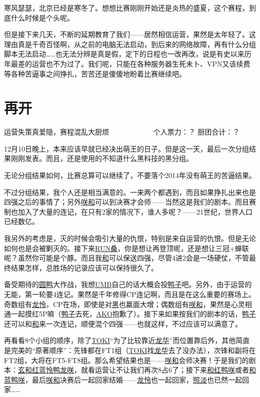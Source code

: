 寒风瑟瑟，北京已经是寒冬了。想想比赛刚刚开始还是炎热的盛夏，这个赛程，到底什么时候是个头呢。

但是接下来几天，不断的延期教育了我们——居然相信运营，果然是太年轻了。这理由真是千奇百怪啊，从之前的电脑无法启动，到后来的网络故障，再有什么分组脚本无法启动……也无法分辨是真是假，定下的日程也一改再改，说是有史以来历年最差的运营也不为过了。我们呢，只能在各种服务器生死未卜、VPN又该续费等各种苦逼事之间挣扎，苦苦还是傻傻地盼着比赛继续吧。

\chapter{再开}
\begin{center}
{\subTitle 运营失策真爱隐，赛程混乱大厨烦}
\subMemo
　　　　　　个人票力：？ 厨团合计：？
\end{center}

12月10日晚上，本来应该早就已经决出萌王的日子。但是这一天，最后一次分组结果刚刚发表。而且，还是使用的不知道什么黑科技的黑分组。

无论分组结果如何，比赛总算可以继续了，不要落个2014年没有萌王的苦逼结果。

不过分组结果，我个人还是相当满意的。一来两个都遇到，而且如果挣扎出来也是四强之后的事情了；另外\uline{咲}\uline{和}可以到决赛才会师——当然这是我们的剧本。而且赛制也加入了大量的连记，在只有2家的情况下，谁人多呢？——21世纪，世界人口已经数亿。

我另外的考虑是，灭的时候会吸引大量的仇恨，特别是来自运营的仇恨。但是无论如何也是会被剿灭的。接下来\uline{RUN桑}，你是想让再登顶呢，还是想让三冠+蝉联呢？虽然你可能是个豚。而且我\uline{和}可以保送四强，尽管4进2会是一场硬仗，不管最终结果怎样，总胜场的记录应该可以保持很久了。

备受期待的\uline{圆}\uline{鸭}大作战，我想\uline{UMB}自己的话大概会投\uline{鸭子}吧。另外，由于运营的无能，第一轮要4连记。果然是千年修得CP连记啊，而且是在这么重要的赛场上。奇数组有\uline{龙}\uline{怜}，CP在场，即使是对\uline{黑}也赢面大增；偶数组有\uline{咲}\uline{和}，果然是心灵相通一起摸红5P嘛（\uline{鸭子}去死，\uline{AKO}抱歉了）。接下来如果按我们的剧本的话，\uline{鸭子}还可以和\uline{和}来一次连记，顺便混个四强——也就这样，不过应该可以满意了。

再看看8个小组的顺序，除了\uline{TOKI}“为了比较靠近\uline{龙华}”而位置靠后外，其他简直是完美的“原著顺序”：先锋都在FT1组（\uline{TOKI}找\uline{龙华}去了没办法），次锋和副将在FT2组，大将在FT5-FT8组。那么希望结果也是——\uline{咲}\uline{和}会师决赛！于是我们的剧本：\uline{玄和红蓝怜鸭龙咲}，就看运营让不让我们再次8占6了；接下来\uline{和红鸭咲}或者\uline{和蓝鸭咲}，最后\uline{咲}\uline{和}决赛后一起回家结婚——\uline{龙}\uline{怜}也一起回家，\uline{照淡}也已然一起回家……

